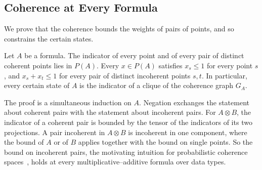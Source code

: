 \subsection{Coherence at Every Formula}
\label{sec:linear-coherence}

We prove that the coherence bounds the weights of pairs of points,
and so constrains the certain states.

\begin{theorem}
\label{thm:mall}
Let $A$ be a formula. The indicator of every point and of every pair of
distinct coherent points lies in $P(A)$. Every $x \in P(A)$ satisfies
$x_s \le 1$ for every point $s$, and $x_s + x_t \le 1$ for every pair of
distinct incoherent points $s, t$. In particular, every certain state of
$A$ is the indicator of a clique of the coherence graph $G_A$.
\end{theorem}

\noindent
The proof is a simultaneous induction on $A$. Negation exchanges the
statement about coherent pairs with the statement about incoherent pairs.
For $A \otimes B$, the indicator of a coherent pair is bounded by the
tensor of the indicators of its two projections. A pair incoherent in
$A \otimes B$ is incoherent in one component, where the bound of $A$ or of
$B$ applies together with the bound on single points. So the bound on
incoherent pairs, the motivating intuition for probabilistic coherence
spaces~\cite{girard2004}, holds at every multiplicative--additive formula
over data types.


